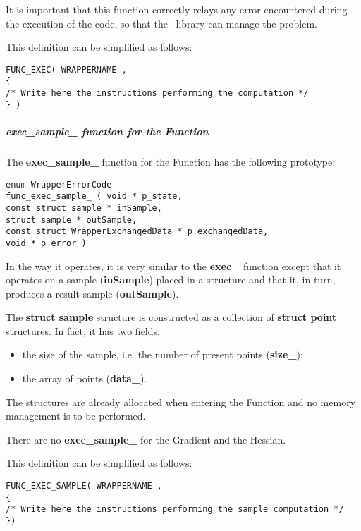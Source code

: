 It is important that this function correctly relays any error encountered during the execution of the code, so that the \OT\ library can manage the problem.

This definition can be simplified as follows:
\lstset{language=C++, basicstyle=\normalsize}
\begin{lstlisting}[frame=TBRL]
FUNC_EXEC( WRAPPERNAME ,
{
/* Write here the instructions performing the computation */
} )
\end{lstlisting}

\subparagraph {exec\_sample\_ function for the Function}

The {\bf exec\_sample\_} function for the Function has the following prototype:

\lstset{language=C++, basicstyle=\normalsize}
\begin{lstlisting}[frame=TBRL]
enum WrapperErrorCode
func_exec_sample_ ( void * p_state,
const struct sample * inSample,
struct sample * outSample,
const struct WrapperExchangedData * p_exchangedData,
void * p_error )
\end{lstlisting}

In the way it operates, it is very similar to the {\bf exec\_} function except that it operates on a sample ({\bf inSample}) placed in a  structure and that it, in turn, produces a result sample ({\bf outSample}).

The {\bf struct sample} structure is constructed as a collection of {\bf struct point} structures. In fact, it has two fields:
\begin{itemize}
\item the size of the sample, i.e. the number of present points ({\bf size\_});
\item the array of points ({\bf data\_}).
\end{itemize}

The structures are already allocated when entering the Function and no memory management is to be performed.

There are no {\bf exec\_sample\_} for the Gradient and the Hessian.

This definition can be simplified as follows:
\lstset{language=C++, basicstyle=\normalsize}
\begin{lstlisting}[frame=TBRL]
FUNC_EXEC_SAMPLE( WRAPPERNAME ,
{
/* Write here the instructions performing the sample computation */
})
\end{lstlisting}

